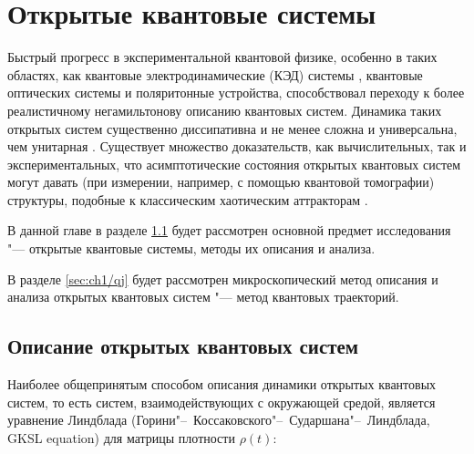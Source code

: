 \chapter{Открытые квантовые системы}\label{ch:ch1}

Быстрый прогресс в экспериментальной квантовой физике, особенно в таких областях, как квантовые электродинамические (КЭД) системы \cite{Walther2006}, квантовые оптических системы \cite{Aspelmeyer2014} и поляритонные устройства\cite{Feurer2003}, способствовал переходу к более реалистичному негамильтонову описанию квантовых систем. 
Динамика таких открытых систем существенно диссипативна и не менее сложна и универсальна, чем унитарная \cite{Diehl2008, Budich2015}. 
Существует множество доказательств, как вычислительных, так и экспериментальных, что асимптотические состояния открытых квантовых систем могут давать (при измерении, например, с помощью квантовой томографии) структуры, подобные к классическим хаотическим аттракторам \cite{Spiller1994, Brun1996, Hartmann2017, Ivanchenko2017, Carlo2017, Wang2018}. 

В данной главе в разделе \cref{sec:ch1/oqs_desc} будет рассмотрен основной предмет исследования "--- открытые квантовые системы, методы их описания и анализа.
 
В разделе \cref{sec:ch1/qj} будет рассмотрен микроскопический метод описания и анализа открытых квантовых систем "--- метод квантовых траекторий.

\section{Описание открытых квантовых систем}\label{sec:ch1/oqs_desc}

Наиболее общепринятым способом описания динамики открытых квантовых систем, то есть систем, взаимодействующих с окружающей средой, является уравнение Линдблада (Горини"--~Коссаковского"--~Сударшана"--~Линдблада, GKSL equation) \cite{Gorini1976, Lindblad1976, Chruciski2017} для матрицы плотности \(\rho (t)\):

